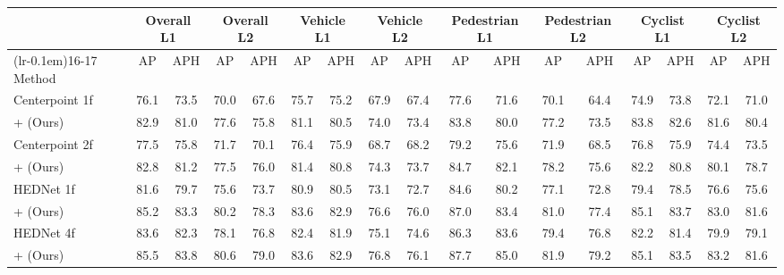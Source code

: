 \begin{table}[t]
    \centering
    \footnotesize
    \begin{tabular}{@{}lcccccccccccccccc@{}}
    \toprule
                            & \multicolumn{2}{c}{Overall L1} & \multicolumn{2}{c}{Overall L2} & \multicolumn{2}{c}{Vehicle L1} & \multicolumn{2}{c}{Vehicle L2} & \multicolumn{2}{c}{Pedestrian L1} & \multicolumn{2}{c}{Pedestrian L2} & \multicolumn{2}{c}{Cyclist L1} & \multicolumn{2}{c}{Cyclist L2} \\ 
                            \cmidrule(lr){2-3} \cmidrule(lr){4-5} \cmidrule(lr){6-7} \cmidrule(lr){8-9} \cmidrule(lr){10-11} \cmidrule(lr){12-13} \cmidrule(lr{5em}){13-14} \cmidrule(lr){14-15}  \cmidrule(lr{5em}){15-16} \cmidrule(lr{-0.1em}){16-17}
    Method                             & AP            & APH  & AP   & APH  & AP            & APH  & AP   & APH  & AP   & APH  & AP   & APH  & AP   & APH  & AP   & APH  \\ \midrule
    Centerpoint 1f~\cite{centerpoint}  & 76.1          & 73.5 & 70.0 & 67.6 & 75.7          & 75.2 & 67.9 & 67.4 & 77.6 & 71.6 & 70.1 & 64.4 & 74.9 & 73.8 & 72.1 & 71.0 \\
    \rowcolor{tablecolor}
    + \ourmodel{} (Ours)               & 82.9          & 81.0 &77.6 & 75.8 & 81.1 & 80.5 & 74.0 & 73.4 & 83.8 & 80.0 & 77.2 & 73.5 & 83.8 & 82.6 & 81.6 &80.4 \\ \midrule
    Centerpoint 2f~\cite{centerpoint}  & 77.5          & 75.8 & 71.7 & 70.1 & 76.4          & 75.9 & 68.7 & 68.2 & 79.2 & 75.6 & 71.9 & 68.5 & 76.8 & 75.9 & 74.4 & 73.5 \\
    \rowcolor{tablecolor}
    + \ourmodel{} (Ours)               & 82.8 & 81.2 & 77.5 & 76.0 & 81.4 & 80.8 & 74.3 & 73.7 & 84.7 & 82.1 & 78.2 & 75.6 & 82.2 & 80.8 & 80.1 & 78.7 \\ \midrule
    HEDNet 1f~\cite{hednet}            & 81.6          & 79.7 & 75.6 & 73.7 & 80.9          & 80.5 & 73.1 & 72.7 & 84.6 & 80.2 & 77.1 & 72.8 & 79.4 & 78.5 & 76.6 & 75.6 \\
    \rowcolor{tablecolor}
    + \ourmodel{} (Ours)               & 85.2 & 83.3 & 80.2 & 78.3 & 83.6 & 82.9 & 76.6 & 76.0 & 87.0 & 83.4 & 81.0 & 77.4 & 85.1 & 83.7 & 83.0 & 81.6 \\ \midrule
    HEDNet 4f~\cite{hednet}            & 83.6          & 82.3 & 78.1 & 76.8 & 82.4          & 81.9 & 75.1 & 74.6 & 86.3 & 83.6 & 79.4 & 76.8 & 82.2 & 81.4 & 79.9 & 79.1 \\
    \rowcolor{tablecolor}
    + \ourmodel{} (Ours)               & 85.5 & 83.8 & 80.6 & 79.0 & 83.6 & 82.9 & 76.8 & 76.1 & 87.7 & 85.0 & 81.9 & 79.2 & 85.1 & 83.5 & 83.2 & 81.6 \\ \midrule

\end{tabular}
\end{table}
